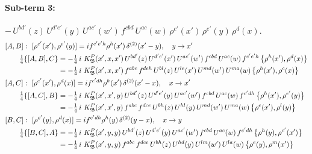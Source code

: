\documentclass[10pt]{article}
\numberwithin{equation}{section}
\begin{document}
\paragraph{Sub-term 3:} $-\,U^{bd'}(z)\,U^{d'e'}(y)\,U^{ac'}(w')\,f^{cbd}\,U^{ac}(w)\,\rho^{c'}(x')\,\rho^{e'}(y)\,\rho^{d}(x)$.
\begin{align}
&[A,B]:\ [\rho^{c'}(x'),\rho^{e'}(y)]=i f^{c'e'h}\rho^{h}(x')\,\delta^{(2)}(x'-y),\quad y\to x'\notag\\
&\qquad \tfrac14\{[A,B],C\}=-\tfrac14\,i\,\,K^{P}_{\mathfrak B}(x',x,x')\,U^{bd'}(z)\,U^{d'e'}(x')\,U^{ac'}(w')\,f^{cbd}\,U^{ac}(w)\,f^{c'e'h}\,\big\{\rho^{h}(x'),\rho^{d}(x)\big\}\notag\\
&\qquad\phantom{\tfrac14\{[A,B],C\}}=-\tfrac14\,i\,\,K^{P}_{\mathfrak B}(x',x,x')\,f^{abc}\,f^{deh}\,U^{bl}(z)\,U^{le}(x')\,U^{md}(w')\,U^{ma}(w)\,\big\{\rho^{h}(x'),\rho^{c}(x)\big\}
\label{B:eq:GIII.I.P-3-AB}\\
&[A,C]:\ [\rho^{c'}(x'),\rho^{d}(x)]=i f^{c'dh}\rho^{h}(x')\,\delta^{(2)}(x'-x),\quad x\to x'\notag\\
&\qquad \tfrac14\{[A,C],B\}=-\tfrac14\,i\,\,K^{P}_{\mathfrak B}(x',x',y)\,U^{bd'}(z)\,U^{d'e'}(y)\,U^{ac'}(w')\,f^{cbd}\,U^{ac}(w)\,f^{c'dh}\,\big\{\rho^{h}(x'),\rho^{e'}(y)\big\}\notag\\
&\qquad\phantom{\tfrac14\{[A,C],B\}}=-\tfrac14\,i\,\,K^{P}_{\mathfrak B}(x',x',y)\,f^{abc}\,f^{dce}\,U^{bh}(z)\,U^{hl}(y)\,U^{md}(w')\,U^{ma}(w)\,\big\{\rho^{e}(x'),\rho^{l}(y)\big\}
\label{B:eq:GIII.I.P-3-AC}\\
&[B,C]:\ [\rho^{e'}(y),\rho^{d}(x)]=i f^{e'dh}\rho^{h}(y)\,\delta^{(2)}(y-x),\quad x\to y\notag\\
&\qquad \tfrac14\{[B,C],A\}=-\tfrac14\,i\,\,K^{P}_{\mathfrak B}(x',y,y)\,U^{bd'}(z)\,U^{d'e'}(y)\,U^{ac'}(w')\,f^{cbd}\,U^{ac}(w)\,f^{e'dh}\,\big\{\rho^{h}(y),\rho^{c'}(x')\big\}\notag\\
&\qquad\phantom{\tfrac14\{[B,C],A\}}=-\tfrac14\,i\,\,K^{P}_{\mathfrak B}(x',y,y)\,f^{abc}\,f^{dce}\,U^{bh}(z)\,U^{hd}(y)\,U^{lm}(w')\,U^{la}(w)\,\big\{\rho^{e}(y),\rho^{m}(x')\big\}
\label{B:eq:GIII.I.P-3-BC}
\end{align}
\end{document}
